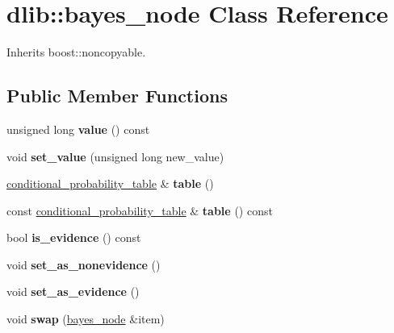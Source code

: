 \hypertarget{classdlib_1_1bayes__node}{
\section{dlib::bayes\_\-node Class Reference}
\label{classdlib_1_1bayes__node}
}


Inherits boost::noncopyable.\subsection*{Public Member Functions}
\begin{DoxyCompactItemize}
\item 
\hypertarget{classdlib_1_1bayes__node_af0f4424ec96f869df6afee921f880796}{
unsigned long {\bfseries value} () const }
\label{classdlib_1_1bayes__node_af0f4424ec96f869df6afee921f880796}

\item 
\hypertarget{classdlib_1_1bayes__node_ad128a535311efa22a443c5df64de226b}{
void {\bfseries set\_\-value} (unsigned long new\_\-value)}
\label{classdlib_1_1bayes__node_ad128a535311efa22a443c5df64de226b}

\item 
\hypertarget{classdlib_1_1bayes__node_a402ff3dd0031445fedc29a0eb78369ea}{
\hyperlink{classdlib_1_1conditional__probability__table}{conditional\_\-probability\_\-table} \& {\bfseries table} ()}
\label{classdlib_1_1bayes__node_a402ff3dd0031445fedc29a0eb78369ea}

\item 
\hypertarget{classdlib_1_1bayes__node_a542c00603222cc1d12a9014b3276b7b6}{
const \hyperlink{classdlib_1_1conditional__probability__table}{conditional\_\-probability\_\-table} \& {\bfseries table} () const }
\label{classdlib_1_1bayes__node_a542c00603222cc1d12a9014b3276b7b6}

\item 
\hypertarget{classdlib_1_1bayes__node_a614113e5fbf2e71f28fcce3d2593bd13}{
bool {\bfseries is\_\-evidence} () const }
\label{classdlib_1_1bayes__node_a614113e5fbf2e71f28fcce3d2593bd13}

\item 
\hypertarget{classdlib_1_1bayes__node_a9fb1f50ecc46d11d7ea60aa69513d204}{
void {\bfseries set\_\-as\_\-nonevidence} ()}
\label{classdlib_1_1bayes__node_a9fb1f50ecc46d11d7ea60aa69513d204}

\item 
\hypertarget{classdlib_1_1bayes__node_a13d6fd593abe483fb70fc2702d6287e1}{
void {\bfseries set\_\-as\_\-evidence} ()}
\label{classdlib_1_1bayes__node_a13d6fd593abe483fb70fc2702d6287e1}

\item 
\hypertarget{classdlib_1_1bayes__node_ae6991652466762454c7ea8ac0abfddd6}{
void {\bfseries swap} (\hyperlink{classdlib_1_1bayes__node}{bayes\_\-node} \&item)}
\label{classdlib_1_1bayes__node_ae6991652466762454c7ea8ac0abfddd6}

\end{DoxyCompactItemize}

